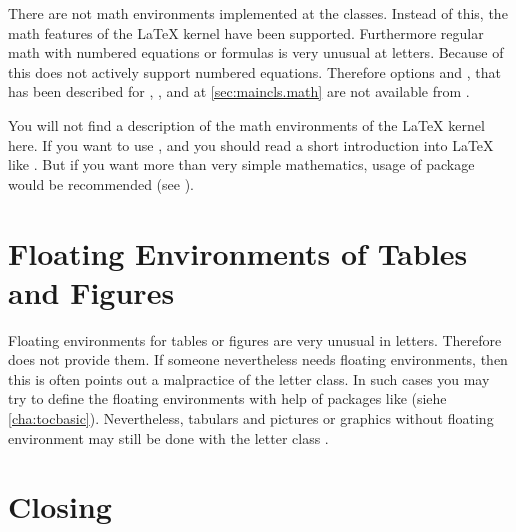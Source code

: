 There are not math environments implemented at the \KOMAScript{}
classes. Instead of this, the math features of the \LaTeX{} kernel have been
supported. Furthermore regular math with numbered
equations or formulas is very unusual at letters. Because of this
 does not actively support numbered equations. Therefore
options  and , that has been described for
, , and  at
\autoref{sec:maincls.math} are not available from .

You will not find a description of the math environments of the \LaTeX{} kernel
here. If you want to use ,
 and
 you should read a short introduction
into \LaTeX{} like \cite{lshort}. But if you want more than
very simple mathematics, usage of package  would be
recommended (see \cite{package:amsmath}).%
%
\EndIndexGroup


\section{Floating Environments of Tables and Figures}

Floating environments for tables or figures are very unusual in
letters. Therefore  does not provide
them. If someone nevertheless needs floating environments, then this is often
points out a malpractice of the letter class. In such cases you may try to
define the floating environments with help of packages like  (siehe
\autoref{cha:tocbasic}). Nevertheless, tabulars and pictures or graphics
without floating environment may still be done with the letter class
.




\section{Closing}
\BeginIndexGroup%
%
%
%
%

